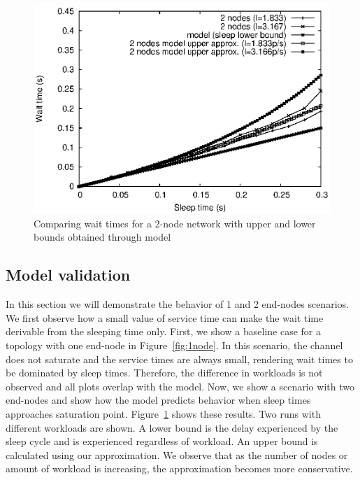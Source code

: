 \begin{figure}[t]
\centering
\includegraphics[scale=0.65]{figures/sleep_model_2nodes.eps}
\caption{Comparing wait times for a 2-node network with upper and lower bounds obtained through model}
\label{fig:wait_times_2nodes}
\end{figure}


\subsection{Model validation}
In this section we will demonstrate the behavior of 1 and 2 end-nodes scenarios. We first observe how a small value of service time can make the wait time derivable from the sleeping time only. First, we show a baseline case for a topology with one end-node in Figure~\ref{fig:1node}. In this scenario, the channel does not saturate and the service times are always small, rendering wait times to be dominated by sleep times. Therefore, the difference in workloads is not observed and all plots overlap with the model. Now, we show a scenario with two end-nodes and show how the model predicts behavior when sleep times approaches saturation point. Figure~\ref{fig:wait_times_2nodes} shows these results. Two runs with different workloads are shown. A lower bound is the delay experienced by the sleep cycle and is experienced regardless of workload. An upper bound is calculated using our approximation. We observe that as the number of nodes or amount of workload is increasing, the approximation becomes more conservative.

